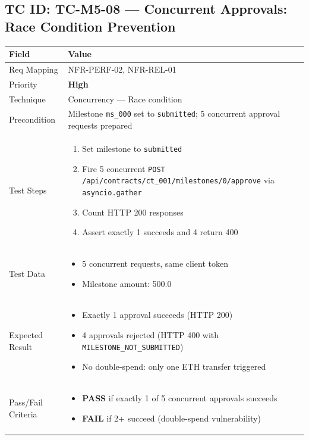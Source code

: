 \documentclass[12pt,a4paper]{article}
\newcommand{\sevhigh}{\textcolor{severityhigh}{\textbf{High}}}
\newcommand{\passresult}{\textcolor{passgreen}{\textbf{PASS}}}
\newcommand{\failresult}{\textcolor{failred}{\textbf{FAIL}}}
\begin{document}
\vspace{0.8cm}

\subsection{TC ID: TC-M5-08 --- Concurrent Approvals: Race Condition Prevention}

\begin{tabular}{|p{}|p{}|}
\hline
\rowcolor{lightblue} \textbf{Field} & \textbf{Value} \\
\hline
Req Mapping & NFR-PERF-02, NFR-REL-01 \\
\hline
Priority & \sevhigh \\
\hline
Technique & Concurrency --- Race condition \\
\hline
Precondition & Milestone \texttt{ms\_000} set to \texttt{submitted}; 5 concurrent approval requests prepared \\
\hline
Test Steps &
\begin{enumerate}[nosep, leftmargin=*]
  \item Set milestone to \texttt{submitted}
  \item Fire 5 concurrent \texttt{POST /api/contracts/ct\_001/milestones/0/approve} via \texttt{asyncio.gather}
  \item Count HTTP 200 responses
  \item Assert exactly 1 succeeds and 4 return 400
\end{enumerate} \\
\hline
Test Data &
\begin{itemize}[nosep, leftmargin=*]
  \item 5 concurrent requests, same client token
  \item Milestone amount: 500.0
\end{itemize} \\
\hline
Expected Result &
\begin{itemize}[nosep, leftmargin=*]
  \item Exactly 1 approval succeeds (HTTP 200)
  \item 4 approvals rejected (HTTP 400 with \texttt{MILESTONE\_NOT\_SUBMITTED})
  \item No double-spend: only one ETH transfer triggered
\end{itemize} \\
\hline
Pass/Fail Criteria &
\begin{itemize}[nosep, leftmargin=*]
  \item \passresult{} if exactly 1 of 5 concurrent approvals succeeds
  \item \failresult{} if 2+ succeed (double-spend vulnerability)
\end{itemize} \\
\hline
\end{tabular}
\end{document}
